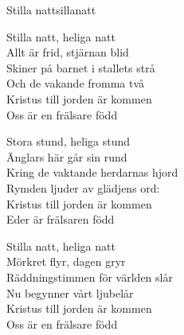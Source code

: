 \begin{song}{Stilla natt}{sillanatt}
\begin{vers}
Stilla natt, heliga natt\\
Allt är frid, stjärnan blid\\
Skiner på barnet i stallets strå\\
Och de vakande fromma två\\
Kristus till jorden är kommen\\
Oss är en frälsare född\\
\end{vers}
\begin{vers}
Stora stund, heliga stund\\
Änglars här går sin rund\\
Kring de vaktande herdarnas hjord\\
Rymden ljuder av glädjens ord:\\
Kristus till jorden är kommen\\
Eder är frälsaren född\\
\end{vers}
\begin{vers}
Stilla natt, heliga natt\\
Mörkret flyr, dagen gryr\\
Räddningstimmen för världen slår\\
Nu begynner vårt ljubelår\\
Kristus till jorden är kommen\\
Oss är en frälsare född\\
\end{vers}
\end{song}
